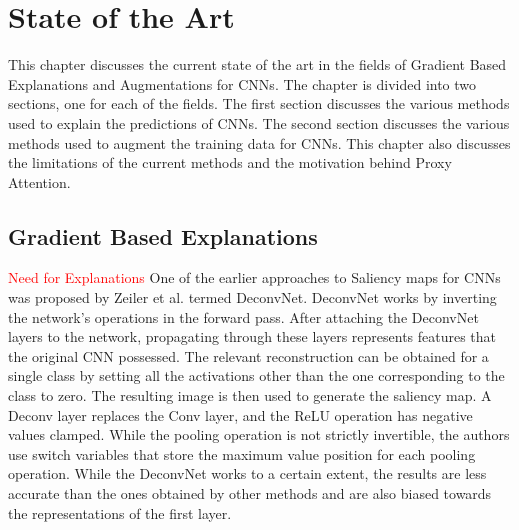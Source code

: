 \chapter{State of the Art} \label{ch:sota}
This chapter discusses the current state of the art in the fields of Gradient Based Explanations and Augmentations for CNNs. The chapter is divided into two sections, one for each of the fields. The first section discusses the various methods used to explain the predictions of CNNs. The second section discusses the various methods used to augment the training data for CNNs. This chapter also discusses the limitations of the current methods and the motivation behind Proxy Attention.

\section{Gradient Based Explanations}
\textcolor{red}{Need for Explanations}
One of the earlier approaches to Saliency maps for CNNs was proposed by Zeiler et al. \cite{zeilerVisualizingUnderstandingConvolutional2013} termed DeconvNet. DeconvNet works by inverting the network's operations in the forward pass. After attaching the DeconvNet layers to the network, propagating through these layers represents features that the original CNN possessed. The relevant reconstruction can be obtained for a single class by setting all the activations other than the one corresponding to the class to zero. The resulting image is then used to generate the saliency map. A Deconv layer replaces the Conv layer, and the ReLU operation has negative values clamped. While the pooling operation is not strictly invertible, the authors use switch variables that store the maximum value position for each pooling operation. While the DeconvNet works to a certain extent, the results are less accurate than the ones obtained by other methods and are also biased towards the representations of the first layer.

